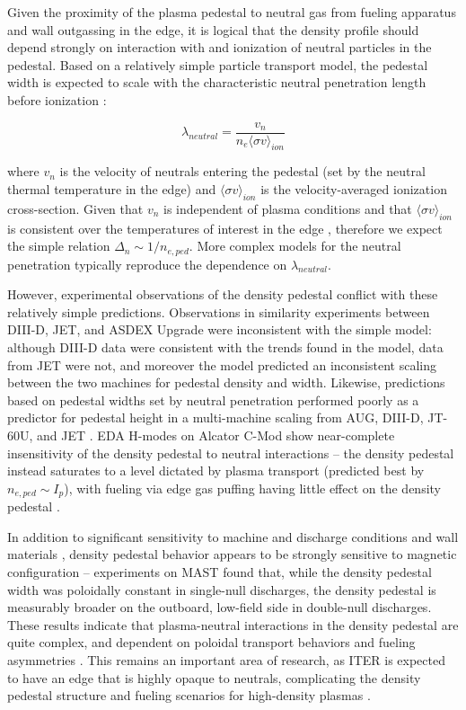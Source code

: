 Given the proximity of the plasma pedestal to neutral gas from fueling apparatus and wall outgassing in the edge, it is logical that the density profile should depend strongly on interaction with and ionization of neutral particles in the pedestal.  Based on a relatively simple particle transport model, the pedestal width is expected to scale with the characteristic neutral penetration length before ionization \cite{Hughes2005,Mahdavi2002}:

\begin{equation}\label{eq:neutralpenetration}
 \lambda_{neutral} = \frac{v_n}{n_e \langle \sigma v \rangle_{ion}}
\end{equation}

\noindent where $v_n$ is the velocity of neutrals entering the pedestal (set by the neutral thermal temperature in the edge) and $\langle \sigma v \rangle_{ion}$ is the velocity-averaged ionization cross-section.  Given that $v_n$ is independent of plasma conditions and that $\langle \sigma v \rangle_{ion}$ is consistent over the temperatures of interest in the edge \cite{Hughes2005}, therefore we expect the simple relation $\Delta_{n} \sim 1/n_{e,ped}$.  More complex models for the neutral penetration typically reproduce the dependence on $\lambda_{neutral}$.

However, experimental observations of the density pedestal conflict with these relatively simple predictions.    Observations in similarity experiments between DIII-D, JET, and ASDEX Upgrade \cite{Beurskens2011} were inconsistent with the simple model: although DIII-D data were consistent with the trends found in the model, data from JET were not, and moreover the model predicted an inconsistent scaling between the two machines for pedestal density and width.  Likewise, predictions based on pedestal widths set by neutral penetration performed poorly as a predictor for pedestal height in a multi-machine scaling from AUG, DIII-D, JT-60U, and JET \cite{Onjun2002}.  EDA H-modes on Alcator C-Mod show near-complete insensitivity of the density pedestal to neutral interactions -- the density pedestal instead saturates to a level dictated by plasma transport (predicted best by $n_{e,ped} \sim I_p$), with fueling via edge gas puffing having little effect on the density pedestal \cite{Hughes2006,Hughes2007}.

In addition to significant sensitivity to machine and discharge conditions and wall materials \cite{Beurskens2011}, density pedestal behavior appears to be strongly sensitive to magnetic configuration -- experiments on MAST \cite{Maggi2010} found that, while the density pedestal width was poloidally constant in single-null discharges, the density pedestal is measurably broader on the outboard, low-field side in double-null discharges.  These results indicate that plasma-neutral interactions in the density pedestal are quite complex, and dependent on poloidal transport behaviors and fueling asymmetries \cite{Maggi2010}.  This remains an important area of research, as ITER is expected to have an edge that is highly opaque to neutrals, complicating the density pedestal structure and fueling scenarios for high-density plasmas \cite{Hughes2007,Maggi2010}.

